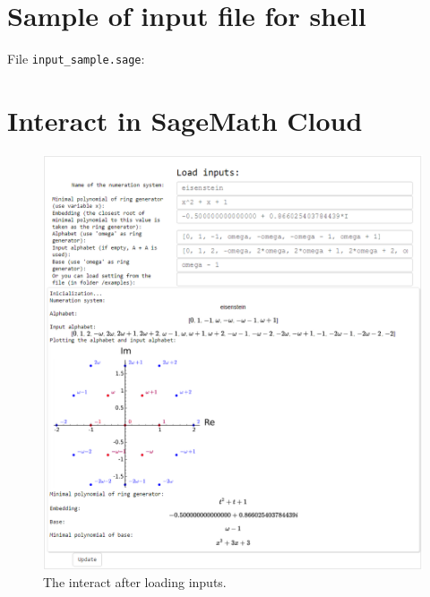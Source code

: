     


\newpage
\section{Sample of input file for shell}
File \verb+input_sample.sage+:
\label{app:inputSample}



\section{Interact in SageMath Cloud}
\label{app:interact}
\begin{figure}[!htbp]
  \centering
  \includegraphics[width=\textwidth]{img/interact1.png}
  \caption{The interact after loading inputs.}
  \label{fig:interact1}
\end{figure}

